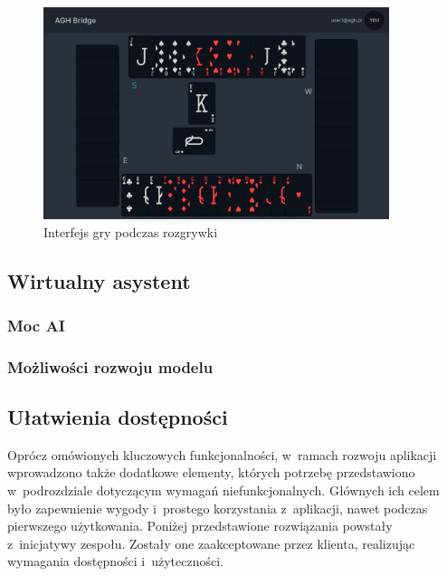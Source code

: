 \begin{figure}[h!]
  \centering
  \includegraphics[width=0.9\textwidth]{img/widoki/game.png}
  \caption{Interfejs gry podczas rozgrywki}
  \label{fig:bidding}
\end{figure}

\FloatBarrier

\subsection{Wirtualny asystent}

\subsubsection{Moc AI}
\label{subsubsec:mocai}

\subsubsection{Możliwości rozwoju modelu}

\subsection{Ułatwienia dostępności}

Oprócz omówionych kluczowych funkcjonalności, w~ramach rozwoju
aplikacji wprowadzono także dodatkowe elementy, których
potrzebę przedstawiono w~podrozdziale dotyczącym wymagań
niefunkcjonalnych. Głównych ich celem było zapewnienie
wygody i~prostego korzystania z~aplikacji, nawet podczas
pierwszego użytkowania. Poniżej przedstawione rozwiązania powstały
z~inicjatywy zespołu. Zostały one zaakceptowane przez klienta,
realizując wymagania dostępności i~użyteczności.


